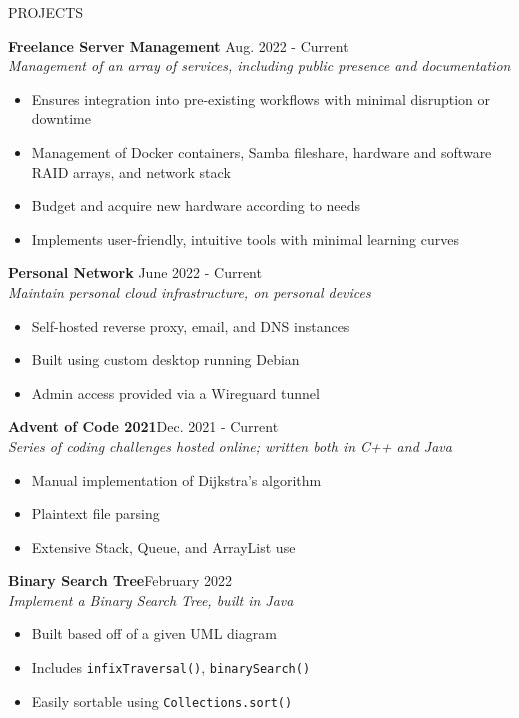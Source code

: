 \documentclass[UTF-8]{resume} \usepackage{multirow}
\begin{document}
\begin{rSection}{PROJECTS}
	\vspace{-1.5em}
    \item \textbf{Freelance Server Management} \hfill {Aug. 2022 - Current}\\
    \emph{Management of an array of services, including public presence and documentation}
	\begin{itemize}
		\itemsep -6pt {}
		\item Ensures integration into pre-existing workflows with minimal disruption or downtime
        \item Management of Docker containers, Samba fileshare, hardware and software RAID arrays, and network stack
		\item Budget and acquire new hardware according to needs
        \item Implements user-friendly, intuitive tools with minimal learning curves
	\end{itemize}
	\item \textbf{Personal Network} \hfill{June 2022 - Current}\\
	\emph{Maintain personal cloud infrastructure, on personal devices}
	\begin{itemize}
		\itemsep -6pt {}
		\item Self-hosted reverse proxy, email, and DNS instances
		\item Built using custom desktop running Debian
		\item Admin access provided via a Wireguard tunnel
	\end{itemize}
	\item \textbf{Advent of Code 2021}\hfill {Dec. 2021 - Current}\\
	\emph{Series of coding challenges hosted online; written both in C++ and Java}
	\begin{itemize}
		\itemsep -6pt {}
		\item Manual implementation of Dijkstra's algorithm
		\item Plaintext file parsing
		\item Extensive Stack, Queue, and ArrayList use
	\end{itemize}
	\item \textbf{Binary Search Tree}\hfill {February 2022} \\
	\emph{ Implement a Binary Search Tree, built in Java}
	\begin{itemize}
		\itemsep -6pt {}
		\item Built based off of a given UML diagram
		\item Includes \verb|infixTraversal()|, \verb|binarySearch()|
		\item Easily sortable using \verb|Collections.sort()|
	\end{itemize}
\end{rSection}
\end{document}
